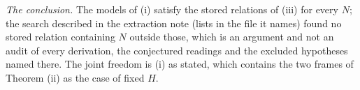 \emph{The conclusion.} The models of (i) satisfy the stored relations of (iii) for every $N$; the search described in the extraction note (lists in the file it names) found no stored relation containing $N$ outside those, which is an argument and not an audit of every derivation, the conjectured readings and the excluded hypotheses named there. The joint freedom is (i) as stated, which contains the two frames of Theorem (ii) as the case of fixed $H$.
